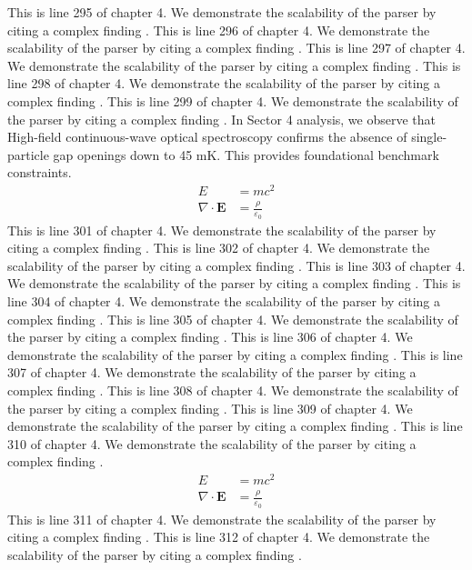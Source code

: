 This is line 295 of chapter 4. We demonstrate the scalability of the parser by citing a complex finding \cite{ref4_295}.
This is line 296 of chapter 4. We demonstrate the scalability of the parser by citing a complex finding \cite{ref4_296}.
This is line 297 of chapter 4. We demonstrate the scalability of the parser by citing a complex finding \cite{ref4_297}.
This is line 298 of chapter 4. We demonstrate the scalability of the parser by citing a complex finding \cite{ref4_298}.
This is line 299 of chapter 4. We demonstrate the scalability of the parser by citing a complex finding \cite{ref4_299}.
In Sector 4 analysis, we observe that High-field continuous-wave optical spectroscopy confirms the absence of single-particle gap openings down to 45 mK. This provides foundational benchmark constraints.
\begin{align*}
  E &= mc^2 \\
  \nabla \cdot \mathbf{E} &= \frac{\rho}{\varepsilon_0}
\end{align*}
This is line 301 of chapter 4. We demonstrate the scalability of the parser by citing a complex finding \cite{ref4_301}.
This is line 302 of chapter 4. We demonstrate the scalability of the parser by citing a complex finding \cite{ref4_302}.
This is line 303 of chapter 4. We demonstrate the scalability of the parser by citing a complex finding \cite{ref4_303}.
This is line 304 of chapter 4. We demonstrate the scalability of the parser by citing a complex finding \cite{ref4_304}.
This is line 305 of chapter 4. We demonstrate the scalability of the parser by citing a complex finding \cite{ref4_305}.
This is line 306 of chapter 4. We demonstrate the scalability of the parser by citing a complex finding \cite{ref4_306}.
This is line 307 of chapter 4. We demonstrate the scalability of the parser by citing a complex finding \cite{ref4_307}.
This is line 308 of chapter 4. We demonstrate the scalability of the parser by citing a complex finding \cite{ref4_308}.
This is line 309 of chapter 4. We demonstrate the scalability of the parser by citing a complex finding \cite{ref4_309}.
This is line 310 of chapter 4. We demonstrate the scalability of the parser by citing a complex finding \cite{ref4_310}.
\begin{align*}
  E &= mc^2 \\
  \nabla \cdot \mathbf{E} &= \frac{\rho}{\varepsilon_0}
\end{align*}
This is line 311 of chapter 4. We demonstrate the scalability of the parser by citing a complex finding \cite{ref4_311}.
This is line 312 of chapter 4. We demonstrate the scalability of the parser by citing a complex finding \cite{ref4_312}.
